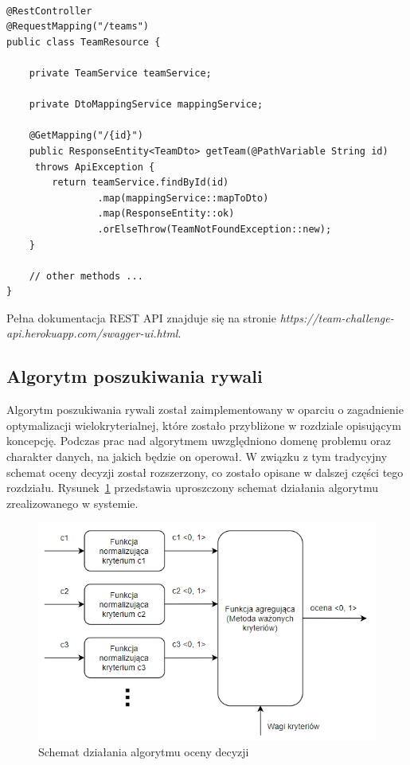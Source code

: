 \begin{minipage}{\linewidth}
\begin{lstlisting}[label=list:resource, caption=Przykładowa rejestracja kontrolera, basicstyle=\footnotesize\ttfamily]

@RestController
@RequestMapping("/teams")
public class TeamResource {

    private TeamService teamService;

    private DtoMappingService mappingService;

    @GetMapping("/{id}")
    public ResponseEntity<TeamDto> getTeam(@PathVariable String id)
     throws ApiException {
        return teamService.findById(id)
                .map(mappingService::mapToDto)
                .map(ResponseEntity::ok)
                .orElseThrow(TeamNotFoundException::new);
    }
    
    // other methods ...
}

\end{lstlisting}
\end{minipage}

Pełna dokumentacja REST API znajduje się na stronie \textit{https://team-challenge-api.herokuapp.com/swagger-ui.html}.   

\subsection{Algorytm poszukiwania rywali}

Algorytm poszukiwania rywali został zaimplementowany w oparciu o zagadnienie optymalizacji wielokryterialnej, które zostało przybliżone w rozdziale opisującym koncepcję. Podczas prac nad algorytmem uwzględniono domenę problemu oraz charakter danych, na jakich będzie on operował. W związku z tym tradycyjny schemat oceny decyzji został rozszerzony, co zostało opisane w dalszej części tego rozdziału. Rysunek~\ref{fig:diagram-alg-ext} przedstawia uproszczony schemat działania algorytmu zrealizowanego w systemie.

\begin{figure}[H]
\centering
\includegraphics[width=0.8\linewidth]{03-koncept/rys/algorytm.PNG}
\caption{Schemat działania algorytmu oceny decyzji}
\label{fig:diagram-alg-ext}
\end{figure}

